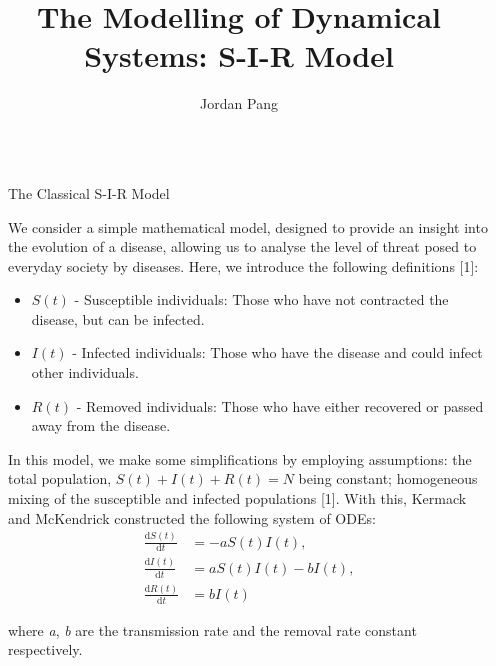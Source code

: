 \documentclass[final]{beamer}
\title{The Modelling of Dynamical Systems: S-I-R Model}
\author{Jordan Pang}
\institute[shortinst]{Department of Mathematics}
\newlength{\sepwidth}
\newlength{\colwidth}
\newcommand{\separatorcolumn}{\begin{column}{\sepwidth}\end{column}}
\begin{document}
{
}



\begin{frame}[t]
\begin{columns}[t]
\separatorcolumn

\begin{column}{\colwidth}

  \begin{block}{The Classical S-I-R Model}

  We consider a simple mathematical model, designed to provide an insight into the evolution of a disease, allowing us to analyse the level of threat posed to everyday society by diseases. Here, we introduce the following definitions [1]:
  \begin{itemize}
      \item $S(t)$ - Susceptible individuals: Those who have not contracted the disease, but can be infected.
      \item $I(t)$ - Infected individuals: Those who have the disease and could infect other individuals.
      \item $R(t)$ - Removed individuals: Those who have either recovered or passed away from the disease.
      
  \end{itemize}

  In this model, we make some simplifications by employing assumptions: the total population, $S(t) + I(t) + R(t) = N$ being constant; homogeneous mixing of the susceptible and infected populations [1]. With this, Kermack and McKendrick constructed the following system of ODEs:
  \begin{align}
  \frac{\textrm{d}S(t)}{\textrm{d}t} &= -aS(t)I(t),\\
  \frac{\textrm{d}I(t)}{\textrm{d}t} &= aS(t)I(t) - bI(t),\\
  \frac{\textrm{d}R(t)}{\textrm{d}t} &= bI(t)
  \end{align}
  
  where \textit{a}, \textit{b} are the transmission rate and the removal rate constant respectively.


\end{block}
\end{column}
\end{columns}
\end{frame}
\end{document}
